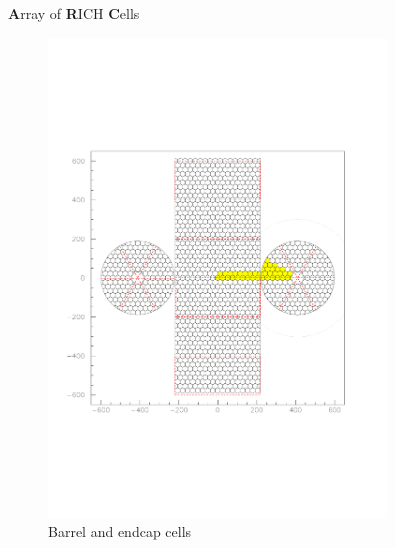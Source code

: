 \documentclass{beamer}
\begin{document}
\begin{frame}{\textbf{A}rray of \textbf{R}ICH \textbf{C}ells}
  \begin{figure}
    \includegraphics[width = 0.8\textwidth, trim = {0 7cm 0 7cm}, clip = true]{Plots/Display3.pdf}
    \caption{Barrel and endcap cells}
  \end{figure}
\end{frame}
\end{document}
